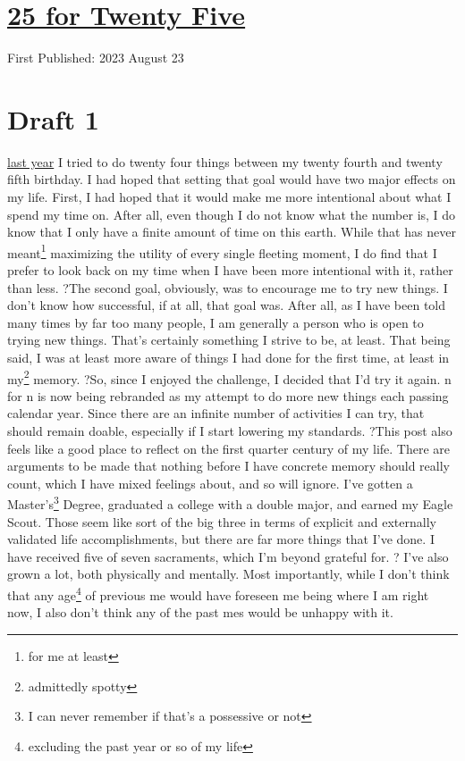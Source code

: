 \documentclass[12pt]{article}[titlepage]
\newcommand{\1}{\={a}}
\newcommand{\2}{\={e}}
\newcommand{\3}{\={\i}}
\newcommand{\4}{\=o}
\newcommand{\5}{\=u}
\newcommand{\6}{\={A}}
\renewcommand{\,}{\textsuperscript{,}}
\begin{document}
\doublespacing
\section{\href{twenty-five-html}{25 for Twenty Five}}
First Published: 2023 August 23


\section{Draft 1}
\href{twenty-four.html}{last year} I tried to do twenty four things between my twenty fourth and twenty fifth birthday.
I had hoped that setting that goal would have two major effects on my life.
First, I had hoped that it would make me more intentional about what I spend my time on.
After all, even though I do not know what the number is, I do know that I only have a finite amount of time on this earth.
While that has never meant\footnote{for me at least} maximizing the utility of every single fleeting moment, I do find that I prefer to look back on my time when I have been more intentional with it, rather than less.
?The second goal, obviously, was to encourage me to try new things.
I don't know how successful, if at all, that goal was.
After all, as I have been told many times by far too many people, I am generally a person who is open to trying new things.
That's certainly something I strive to be, at least.
That being said, I was at least more aware of things I had done for the first time, at least in my\footnote{admittedly spotty} memory.
?So, since I enjoyed the challenge, I decided that I'd try it again.
n for n is now being rebranded as my attempt to do more new things each passing calendar year.
Since there are an infinite number of activities I can try, that should remain doable, especially if I start lowering my standards.
?This post also feels like a good place to reflect on the first quarter century of my life.
There are arguments to be made that nothing before I have concrete memory should really count, which I have mixed feelings about, and so will ignore.
I've gotten a Master's\footnote{I can never remember if that's a possessive or not} Degree, graduated a college with a double major, and earned my Eagle Scout.
Those seem like sort of the big three in terms of explicit and externally validated life accomplishments, but there are far more things that I've done.
I have received five of seven sacraments, which I'm beyond grateful for.
?
I've also grown a lot, both physically and mentally.
Most importantly, while I don't think that any age\footnote{excluding the past year or so of my life} of previous me would have foreseen me being where I am right now, I also don't think any of the past mes would be unhappy with it.
\end{document}
